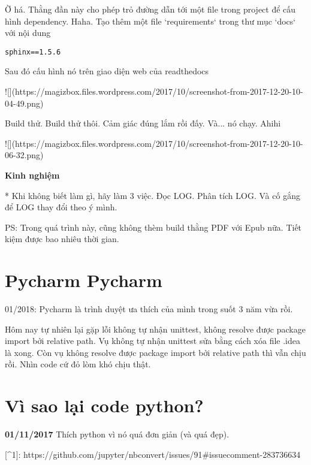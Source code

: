 Ờ há. Thằng đần này cho phép trỏ đường dẫn tới một file trong project để cấu hình dependency. Haha.
Tạo thêm một file `requirements` trong thư mục `docs` với nội dung

\begin{lstlisting}
sphinx==1.5.6
\end{lstlisting}


Sau đó cấu hình nó trên giao diện web của readthedocs

![](https://magizbox.files.wordpress.com/2017/10/screenshot-from-2017-12-20-10-04-49.png)

Build thử. Build thử thôi. Cảm giác đúng lắm rồi đấy. Và... nó chạy. Ahihi

![](https://magizbox.files.wordpress.com/2017/10/screenshot-from-2017-12-20-10-06-32.png)

\textbf{Kinh nghiệm}

* Khi không biết làm gì, hãy làm 3 việc. Đọc LOG. Phân tích LOG. Và cố gắng để LOG thay đổi theo ý mình.

PS: Trong quá trình này, cũng không thèm build thằng PDF với Epub nữa. Tiết kiệm được bao nhiêu thời gian.

\section{Pycharm Pycharm}

01/2018: Pycharm là trình duyệt ưa thích của mình trong suốt 3 năm vừa rồi.

Hôm nay tự nhiên lại gặp lỗi không tự nhận unittest, không resolve được package import bởi relative path. Vụ không tự nhận unittest sửa bằng cách xóa file .idea là xong. Còn vụ không resolve được package import bởi relative path thì vẫn chịu rồi. Nhìn code cứ đỏ lòm khó chịu thật.

\section{Vì sao lại code python?}

\textbf{01/11/2017}
Thích python vì nó quá đơn giản (và quá đẹp).

[^1]: https://github.com/jupyter/nbconvert/issues/91#issuecomment-283736634